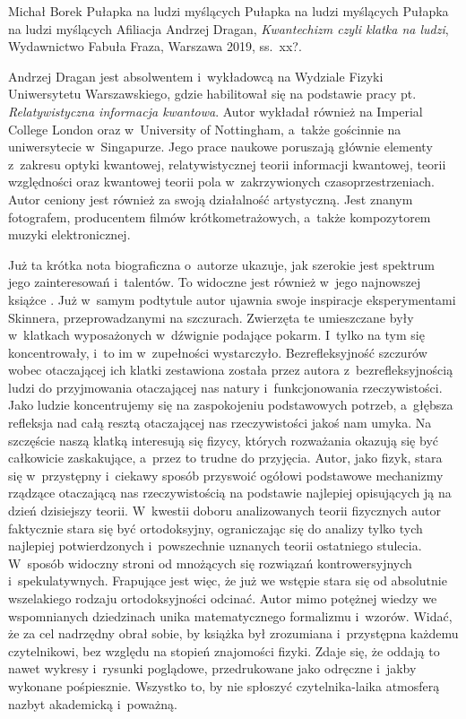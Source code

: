 \begin{newrevplenv}{Michał Borek}
	{Pułapka na ludzi myślących}
	{Pułapka na ludzi myślących}
	{Pułapka na ludzi myślących}
	{Afiliacja}
	{Andrzej Dragan, \textit{Kwantechizm czyli klatka na ludzi}, Wydawnictwo Fabuła Fraza, Warszawa 2019, ss.~xx?.}


\lettrine[loversize=0.13,lines=2,lraise=-0.03,nindent=0em,findent=0.2pt]%
{A}{}ndrzej Dragan jest absolwentem i~wykładowcą na Wydziale Fizyki Uniwersytetu Warszawskiego, gdzie habilitował się na podstawie pracy pt. \textit{Relatywistyczna informacja kwantowa}. Autor wykładał również na Imperial College London oraz w~University of Nottingham, a~także gościnnie na uniwersytecie w~Singapurze. Jego prace naukowe poruszają głównie elementy z~zakresu optyki kwantowej, relatywistycznej teorii informacji kwantowej, teorii względności oraz kwantowej teorii pola w~zakrzywionych czasoprzestrzeniach. Autor ceniony jest również za swoją działalność artystyczną. Jest znanym fotografem, producentem filmów krótkometrażowych, a~także kompozytorem muzyki elektronicznej.

Już ta krótka nota biograficzna o~autorze ukazuje, jak szerokie jest spektrum jego zainteresowań i~talentów. To widoczne jest również w~jego najnowszej książce
\parencite[][]{dragan_kwantechizm_2019}. %
 Już w~samym podtytule autor ujawnia swoje inspiracje eksperymentami Skinnera, przeprowadzanymi na szczurach. Zwierzęta te umieszczane były w~klatkach wyposażonych w~dźwignie podające pokarm. I~tylko na tym się koncentrowały, i~to im w~zupełności wystarczyło. Bezrefleksyjność szczurów wobec otaczającej ich klatki zestawiona została przez autora z~bezrefleksyjnością ludzi do przyjmowania otaczającej nas natury i~funkcjonowania rzeczywistości. Jako ludzie koncentrujemy się na zaspokojeniu podstawowych potrzeb, a~głębsza refleksja nad całą resztą otaczającej nas rzeczywistości jakoś nam umyka. Na szczęście naszą klatką interesują się fizycy, których rozważania okazują się być całkowicie zaskakujące, a~przez to trudne do przyjęcia. Autor, jako fizyk, stara się w~przystępny i~ciekawy sposób przyswoić ogółowi podstawowe mechanizmy rządzące otaczającą nas rzeczywistością na podstawie najlepiej opisujących ją na dzień dzisiejszy teorii. W~kwestii doboru analizowanych teorii fizycznych autor faktycznie stara się być ortodoksyjny, ograniczając się do analizy tylko tych najlepiej potwierdzonych i~powszechnie uznanych teorii ostatniego stulecia. W~sposób widoczny stroni od mnożących się rozwiązań kontrowersyjnych i~spekulatywnych. Frapujące jest więc, że już we wstępie stara się od absolutnie wszelakiego rodzaju ortodoksyjności odcinać. Autor mimo potężnej wiedzy we wspomnianych dziedzinach unika matematycznego formalizmu i~wzorów. Widać, że za cel nadrzędny obrał sobie, by książka był zrozumiana i~przystępna każdemu czytelnikowi, bez względu na stopień znajomości fizyki. Zdaje się, że oddają to nawet wykresy i~rysunki poglądowe, przedrukowane jako odręczne i~jakby wykonane pośpiesznie. Wszystko to, by nie spłoszyć czytelnika-laika atmosferą nazbyt akademicką i~poważną.


\end{newrevplenv}
